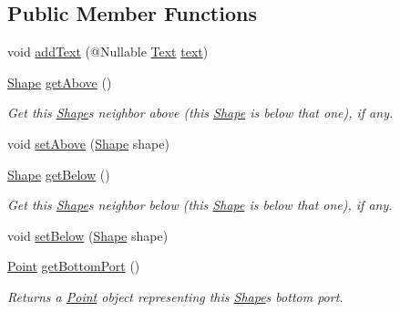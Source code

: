 \subsection*{Public Member Functions}
\begin{DoxyCompactItemize}
\item 
void \hyperlink{classcom_1_1aarrelaakso_1_1drawl_1_1_shape_a9784264f6abcf623b2774d6ef2a53fdc}{add\+Text} (@Nullable \hyperlink{classcom_1_1aarrelaakso_1_1drawl_1_1_text}{Text} \hyperlink{classcom_1_1aarrelaakso_1_1drawl_1_1_shape_ab54afc2d95d3447532f5ecf3fec3faa8}{text})
\item 
\hyperlink{classcom_1_1aarrelaakso_1_1drawl_1_1_shape}{Shape} \hyperlink{classcom_1_1aarrelaakso_1_1drawl_1_1_shape_acebea2aa57031322323c9bf50ee447db}{get\+Above} ()
\begin{DoxyCompactList}\small\item\em Get this \hyperlink{classcom_1_1aarrelaakso_1_1drawl_1_1_shape}{Shape}\textquotesingle{}s neighbor above (this \hyperlink{classcom_1_1aarrelaakso_1_1drawl_1_1_shape}{Shape} is below that one), if any. \end{DoxyCompactList}\item 
void \hyperlink{classcom_1_1aarrelaakso_1_1drawl_1_1_shape_a942b3cf3365498dc1ac6b0309ce33b86}{set\+Above} (\hyperlink{classcom_1_1aarrelaakso_1_1drawl_1_1_shape}{Shape} shape)
\item 
\hyperlink{classcom_1_1aarrelaakso_1_1drawl_1_1_shape}{Shape} \hyperlink{classcom_1_1aarrelaakso_1_1drawl_1_1_shape_a53de5ab609d879719cd3b372dfe8df58}{get\+Below} ()
\begin{DoxyCompactList}\small\item\em Get this \hyperlink{classcom_1_1aarrelaakso_1_1drawl_1_1_shape}{Shape}\textquotesingle{}s neighbor below (this \hyperlink{classcom_1_1aarrelaakso_1_1drawl_1_1_shape}{Shape} is below that one), if any. \end{DoxyCompactList}\item 
void \hyperlink{classcom_1_1aarrelaakso_1_1drawl_1_1_shape_aa0ec0030515b5096820e4dd030c0b320}{set\+Below} (\hyperlink{classcom_1_1aarrelaakso_1_1drawl_1_1_shape}{Shape} shape)
\item 
\hyperlink{classcom_1_1aarrelaakso_1_1drawl_1_1_point}{Point} \hyperlink{classcom_1_1aarrelaakso_1_1drawl_1_1_shape_aba14efe9a16c0808580963c66b171082}{get\+Bottom\+Port} ()
\begin{DoxyCompactList}\small\item\em Returns a \hyperlink{classcom_1_1aarrelaakso_1_1drawl_1_1_point}{Point} object representing this \hyperlink{classcom_1_1aarrelaakso_1_1drawl_1_1_shape}{Shape}\textquotesingle{}s bottom port. \end{DoxyCompactList}\item 

\end{DoxyCompactItemize}
